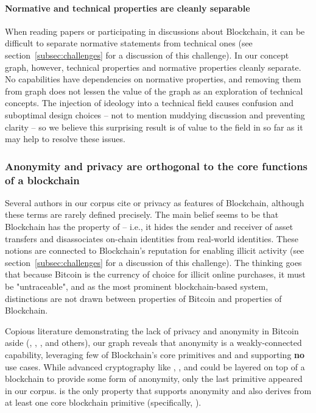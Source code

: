 {\paragraph{Normative and technical properties are cleanly separable}
When reading papers or participating in discussions about Blockchain, it can be difficult to separate normative statements from technical ones (see section~\ref{subsec:challenges} for a discussion of this challenge). In our concept graph, however, technical properties and normative properties cleanly separate. No capabilities have dependencies on normative properties, and removing them from graph does not lessen the value of the graph as an exploration of technical concepts. The injection of ideology into a technical field causes confusion and suboptimal design choices -- not to mention muddying discussion and preventing clarity -- so we believe this surprising result is of value to the field in so far as it may help to resolve these issues.

\subsubsection{Anonymity and privacy are orthogonal to the core functions of a blockchain}
Several authors in our corpus cite  or privacy as features of Blockchain, although these terms are rarely defined precisely. The main belief seems to be that Blockchain has the property of  -- i.e., it hides the sender and receiver of asset transfers and disassociates on-chain identities from real-world identities. These notions are connected to Blockchain's reputation for enabling illicit activity (see section~\ref{subsec:challenges} for a discussion of this challenge). The thinking goes that because Bitcoin is the currency of choice for illicit online purchases, it must be "untraceable", and as the most prominent blockchain-based system, distinctions are not drawn between properties of Bitcoin and properties of Blockchain.

Copious literature demonstrating the lack of privacy and anonymity in Bitcoin aside (\cite{Goldfeder17}, \cite{Conti17}, \cite{Androulaki13}, and others), our graph reveals that anonymity is a weakly-connected capability, leveraging few of Blockchain's core primitives and and supporting \textbf{no} use cases. While advanced cryptography like , , and  could be layered on top of a blockchain to provide some form of anonymity, only the last primitive appeared in our corpus.  is the only property that supports anonymity and also derives from at least one core blockchain primitive (specifically, ).

}
